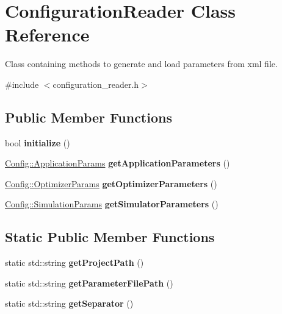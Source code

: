 \hypertarget{class_configuration_reader}{}\section{Configuration\+Reader Class Reference}
\label{class_configuration_reader}


Class containing methods to generate and load parameters from xml file.  




{\ttfamily \#include $<$configuration\+\_\+reader.\+h$>$}

\subsection*{Public Member Functions}
\begin{DoxyCompactItemize}
\item 
\mbox{\label{class_configuration_reader_a48396fe5ae72fe84728917c4d3c1d873}} 
bool {\bfseries initialize} ()
\item 
\mbox{\label{class_configuration_reader_a8a9b59775e830c242e3a11ac7b1e60c4}} 
\hyperlink{struct_config_1_1_application_params}{Config\+::\+Application\+Params} {\bfseries get\+Application\+Parameters} ()
\item 
\mbox{\label{class_configuration_reader_a26229de2dab15c900a09c8b3a2587a90}} 
\hyperlink{struct_config_1_1_optimizer_params}{Config\+::\+Optimizer\+Params} {\bfseries get\+Optimizer\+Parameters} ()
\item 
\mbox{\label{class_configuration_reader_a9a8d35884446e5d4c5beb769445f3b49}} 
\hyperlink{struct_config_1_1_simulation_params}{Config\+::\+Simulation\+Params} {\bfseries get\+Simulator\+Parameters} ()
\end{DoxyCompactItemize}
\subsection*{Static Public Member Functions}
\begin{DoxyCompactItemize}
\item 
\mbox{\label{class_configuration_reader_a48d64d4b30e6b952848f95295cc6aae8}} 
static std\+::string {\bfseries get\+Project\+Path} ()
\item 
\mbox{\label{class_configuration_reader_a8dd351a562599f9017911c9564b06716}} 
static std\+::string {\bfseries get\+Parameter\+File\+Path} ()
\item 
\mbox{\label{class_configuration_reader_a2744da82a66457674996be080d2f37d8}} 
static std\+::string {\bfseries get\+Separator} ()
\end{DoxyCompactItemize}


